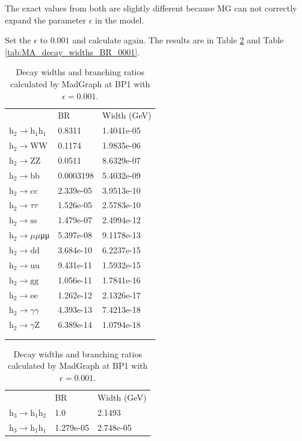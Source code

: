 \documentclass[12pt]{article}
\begin{document}
	The exact values from both are slightly different because MG can not correctly expand the parameter $\epsilon$ in the model.

	Set the $\epsilon$ to $0.001$ and calculate again. The results are in Table \ref{tab:MG_decay_widths_BR_0001} and Table \ref{tab:MA_decay_widths_BR_0001}.

	\begin{table}[htpb]
		\centering
		\caption{Decay widths and branching ratios calculated by MadGraph at BP1 with $\epsilon=0.001$.}
		\label{tab:MG_decay_widths_BR_0001}
		\begin{tabular}{lll}
								  & BR        & Width (GeV) \\
			$\text{h}_2\to\text{h}_1\text{h}_1$ & 0.8311    & 1.4041e-05  \\
			$\text{h}_2\to\text{WW}$   & 0.1174    & 1.9835e-06  \\
			$\text{h}_2\to\text{ZZ}$   & 0.0511    & 8.6329e-07  \\
			$\text{h}_2\to\text{bb}$   & 0.0003198 & 5.4032e-09  \\
			$\text{h}_2\to\text{cc}$   & 2.339e-05 & 3.9513e-10  \\
			$\text{h}_2\to\tau\tau$   & 1.526e-05 & 2.5783e-10  \\
			$\text{h}_2\to\text{ss}$   & 1.479e-07 & 2.4994e-12  \\
			$\text{h}_2\to\mu\mu$μμ   & 5.397e-08 & 9.1178e-13  \\
			$\text{h}_2\to\text{dd}$   & 3.684e-10 & 6.2237e-15  \\
			$\text{h}_2\to\text{uu}$   & 9.431e-11 & 1.5932e-15  \\
			$\text{h}_2\to\text{gg}$   & 1.056e-11 & 1.7841e-16  \\
			$\text{h}_2\to\text{ee}$   & 1.262e-12 & 2.1326e-17  \\
			$\text{h}_2\to\gamma\gamma$   & 4.393e-13 & 7.4213e-18  \\
			$\text{h}_2\to\gamma\text{Z}$   & 6.389e-14 & 1.0794e-18 \\
			\\
			\\
		\end{tabular}
		\begin{tabular}{lll}
								  & BR        & Width (GeV) \\
			$\text{h}_3\to\text{h}_1\text{h}_2$ & 1.0       & 2.1493      \\
			$\text{h}_3\to\text{h}_1\text{h}_1$ & 1.279e-05 & 2.748e-05   \\

\end{tabular}
\end{table}
\end{document}
